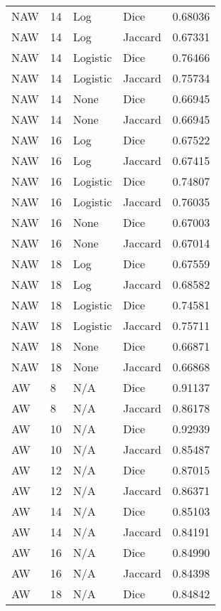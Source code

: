 \documentclass{article}
\begin{document}
\begin{center}
\begin{supertabular}{| l | l | l | l | l |}
               NAW & 14 & Log & Dice & 0.68036 \\
               NAW & 14 & Log & Jaccard & 0.67331 \\
               NAW & 14 & Logistic & Dice & 0.76466 \\
               NAW & 14 & Logistic & Jaccard & 0.75734 \\
               NAW & 14 & None & Dice & 0.66945 \\
               NAW & 14 & None & Jaccard & 0.66945 \\
               NAW & 16 & Log & Dice & 0.67522 \\
               NAW & 16 & Log & Jaccard & 0.67415 \\
               NAW & 16 & Logistic & Dice & 0.74807 \\
               NAW & 16 & Logistic & Jaccard & 0.76035 \\
               NAW & 16 & None & Dice & 0.67003 \\
               NAW & 16 & None & Jaccard & 0.67014 \\
               NAW & 18 & Log & Dice & 0.67559 \\
               NAW & 18 & Log & Jaccard & 0.68582 \\
               NAW & 18 & Logistic & Dice & 0.74581 \\
               NAW & 18 & Logistic & Jaccard & 0.75711 \\
               NAW & 18 & None & Dice & 0.66871 \\
               NAW & 18 & None & Jaccard & 0.66868 \\
               AW & 8 & N/A & Dice & 0.91137 \\
               AW & 8 & N/A & Jaccard & 0.86178 \\
               AW & 10 & N/A & Dice & 0.92939 \\
               AW & 10 & N/A & Jaccard & 0.85487 \\
               AW & 12 & N/A & Dice & 0.87015 \\
               AW & 12 & N/A & Jaccard & 0.86371 \\
               AW & 14 & N/A & Dice & 0.85103 \\
               AW & 14 & N/A & Jaccard & 0.84191 \\
               AW & 16 & N/A & Dice & 0.84990 \\
               AW & 16 & N/A & Jaccard & 0.84398 \\
               AW & 18 & N/A & Dice & 0.84842 \\

\end{supertabular}
\end{center}
\end{document}
